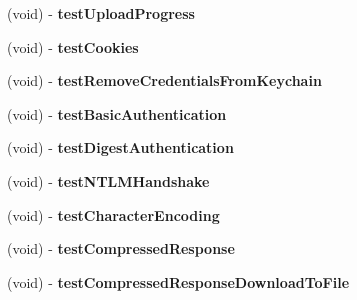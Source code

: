 \begin{DoxyCompactItemize}
\item 
\hypertarget{interface_a_s_i_h_t_t_p_request_tests_a1c5c66bc7434490627a4370af25164ed}{
(void) -\/ {\bfseries test\-Upload\-Progress}}
\label{interface_a_s_i_h_t_t_p_request_tests_a1c5c66bc7434490627a4370af25164ed}

\item 
\hypertarget{interface_a_s_i_h_t_t_p_request_tests_aacb09654f3e66aa17656bbde8866d97d}{
(void) -\/ {\bfseries test\-Cookies}}
\label{interface_a_s_i_h_t_t_p_request_tests_aacb09654f3e66aa17656bbde8866d97d}

\item 
\hypertarget{interface_a_s_i_h_t_t_p_request_tests_ab55f5b89f90f18669e5abe8219ea227d}{
(void) -\/ {\bfseries test\-Remove\-Credentials\-From\-Keychain}}
\label{interface_a_s_i_h_t_t_p_request_tests_ab55f5b89f90f18669e5abe8219ea227d}

\item 
\hypertarget{interface_a_s_i_h_t_t_p_request_tests_a95ec0edfa8e276c8e701b57e76d20c03}{
(void) -\/ {\bfseries test\-Basic\-Authentication}}
\label{interface_a_s_i_h_t_t_p_request_tests_a95ec0edfa8e276c8e701b57e76d20c03}

\item 
\hypertarget{interface_a_s_i_h_t_t_p_request_tests_a66b1d1d52e3faaadb334efa3ca93351e}{
(void) -\/ {\bfseries test\-Digest\-Authentication}}
\label{interface_a_s_i_h_t_t_p_request_tests_a66b1d1d52e3faaadb334efa3ca93351e}

\item 
\hypertarget{interface_a_s_i_h_t_t_p_request_tests_a42b76a1c974d5b1b8ff1a22a20381b06}{
(void) -\/ {\bfseries test\-N\-T\-L\-M\-Handshake}}
\label{interface_a_s_i_h_t_t_p_request_tests_a42b76a1c974d5b1b8ff1a22a20381b06}

\item 
\hypertarget{interface_a_s_i_h_t_t_p_request_tests_ae25e5af72786306a726678b3e50efa71}{
(void) -\/ {\bfseries test\-Character\-Encoding}}
\label{interface_a_s_i_h_t_t_p_request_tests_ae25e5af72786306a726678b3e50efa71}

\item 
\hypertarget{interface_a_s_i_h_t_t_p_request_tests_ae884e3724fa16e86e2c9f202fafb0832}{
(void) -\/ {\bfseries test\-Compressed\-Response}}
\label{interface_a_s_i_h_t_t_p_request_tests_ae884e3724fa16e86e2c9f202fafb0832}

\item 
\hypertarget{interface_a_s_i_h_t_t_p_request_tests_ad9fe5125c3c071c35369d0df17222250}{
(void) -\/ {\bfseries test\-Compressed\-Response\-Download\-To\-File}}
\label{interface_a_s_i_h_t_t_p_request_tests_ad9fe5125c3c071c35369d0df17222250}


\end{DoxyCompactItemize}
